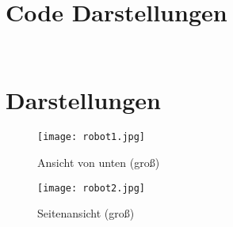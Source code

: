 \appendix
\chapter{Code Darstellungen}
\label{sec:code-darstellungen}

\inputminted{python}{{assets/code/main-api.py}}
\vspace*{-3mm}
\vspace*{3mm}

\inputminted{python}{{assets/code/driving_logic.py}}
\vspace*{-3mm}
\vspace*{3mm}

\chapter{Darstellungen}
\label{sec:darstellungen}

\begin{figure}[H]
    \centering
    \texttt{[image: robot1.jpg]}
    \caption{Ansicht von unten (groß)}
\end{figure}

\begin{figure}[H]
    \centering
    \texttt{[image: robot2.jpg]}
    \caption{Seitenansicht (groß)}
\end{figure}
